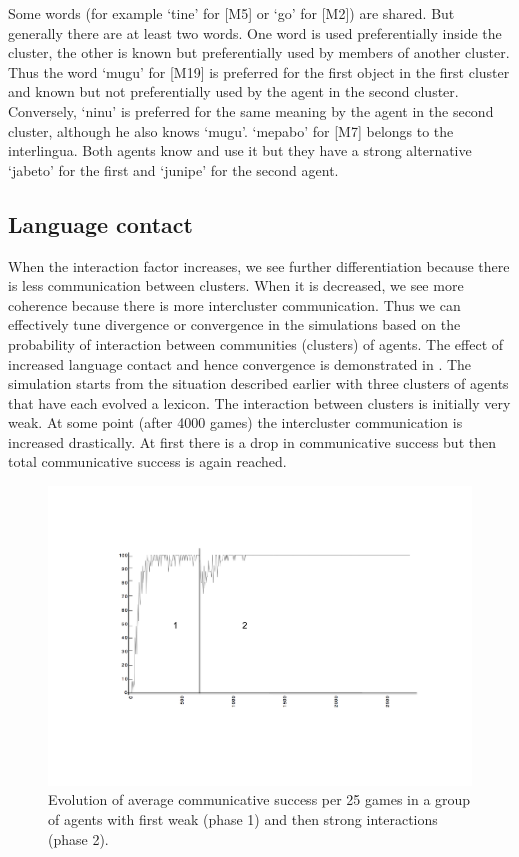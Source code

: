 Some words (for example `tine' for [M5] or `go' for [M2]) are
shared. But generally 
there are at least two words. One word is used preferentially inside the cluster,
the other is known but preferentially used by members of another cluster. Thus
the word `mugu' for [M19] is preferred for the first object in the first
cluster and known but not preferentially used by the agent in the second cluster.
Conversely, `ninu' is preferred for the same meaning by the agent in the second
cluster, although he also knows `mugu'.
`mepabo' for [M7] belongs to the interlingua. Both agents
know and use it but they have a strong alternative `jabeto' for 
the first and `junipe' for the second agent. 

\subsection{Language contact}

When the interaction factor increases, we see further differentiation because
there is less communication between clusters. When it is decreased, we see more
coherence because there is more intercluster communication. Thus we can
effectively tune divergence or convergence in the simulations
based on the probability of interaction
between communities (clusters) of agents. The effect of 
increased language contact and hence convergence is demonstrated in 
. 
The simulation starts from the situation described earlier with three 
clusters of agents that have each evolved a lexicon. 
The interaction between clusters is initially
very weak. At some point (after 4000 games) the intercluster communication is
increased drastically. At first there is a drop in communicative
success but then total communicative success is again reached.


\begin{figure}[htbp]
  \centerline{\includegraphics[width=\textwidth]{chap5/figs/comm-succ.pdf}}
\caption{Evolution of average communicative success per 25 games
in a group of agents with first weak (phase 1) and then strong
interactions (phase 2).}
\label{figure-communicative-success-in-space}
\end{figure}


